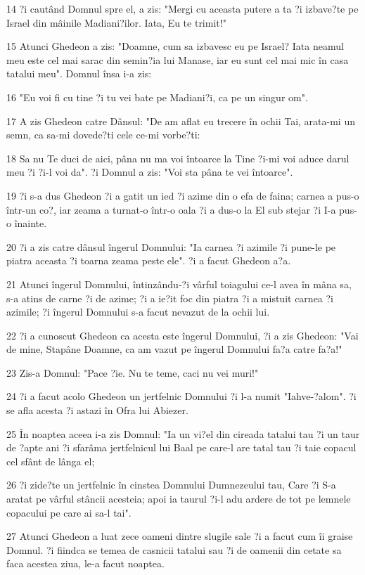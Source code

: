 \par 14 ?i cautând Domnul spre el, a zis: "Mergi cu aceasta putere a ta ?i izbave?te pe Israel din mâinile Madiani?ilor. Iata, Eu te trimit!"
\par 15 Atunci Ghedeon a zis: "Doamne, cum sa izbavesc eu pe Israel? Iata neamul meu este cel mai sarac din semin?ia lui Manase, iar eu sunt cel mai mic în casa tatalui meu". Domnul însa i-a zis:
\par 16 "Eu voi fi cu tine ?i tu vei bate pe Madiani?i, ca pe un singur om".
\par 17 A zis Ghedeon catre Dânsul: "De am aflat eu trecere în ochii Tai, arata-mi un semn, ca sa-mi dovede?ti cele ce-mi vorbe?ti:
\par 18 Sa nu Te duci de aici, pâna nu ma voi întoarce la Tine ?i-mi voi aduce darul meu ?i ?i-l voi da". ?i Domnul a zis: "Voi sta pâna te vei întoarce".
\par 19 ?i s-a dus Ghedeon ?i a gatit un ied ?i azime din o efa de faina; carnea a pus-o într-un co?, iar zeama a turnat-o într-o oala ?i a dus-o la El sub stejar ?i I-a pus-o înainte.
\par 20 ?i a zis catre dânsul îngerul Domnului: "Ia carnea ?i azimile ?i pune-le pe piatra aceasta ?i toarna zeama peste ele". ?i a facut Ghedeon a?a.
\par 21 Atunci îngerul Domnului, întinzându-?i vârful toiagului ce-l avea în mâna sa, s-a atins de carne ?i de azime; ?i a ie?it foc din piatra ?i a mistuit carnea ?i azimile; ?i îngerul Domnului s-a facut nevazut de la ochii lui.
\par 22 ?i a cunoscut Ghedeon ca acesta este îngerul Domnului, ?i a zis Ghedeon: "Vai de mine, Stapâne Doamne, ca am vazut pe îngerul Domnului fa?a catre fa?a!"
\par 23 Zis-a Domnul: "Pace ?ie. Nu te teme, caci nu vei muri!"
\par 24 ?i a facut acolo Ghedeon un jertfelnic Domnului ?i l-a numit "Iahve-?alom". ?i se afla acesta ?i astazi în Ofra lui Abiezer.
\par 25 În noaptea aceea i-a zis Domnul: "Ia un vi?el din cireada tatalui tau ?i un taur de ?apte ani ?i sfarâma jertfelnicul lui Baal pe care-l are tatal tau ?i taie copacul cel sfânt de lânga el;
\par 26 ?i zide?te un jertfelnic în cinstea Domnului Dumnezeului tau, Care ?i S-a aratat pe vârful stâncii acesteia; apoi ia taurul ?i-l adu ardere de tot pe lemnele copacului pe care ai sa-l tai".
\par 27 Atunci Ghedeon a luat zece oameni dintre slugile sale ?i a facut cum îi graise Domnul. ?i fiindca se temea de casnicii tatalui sau ?i de oamenii din cetate sa faca acestea ziua, le-a facut noaptea.
